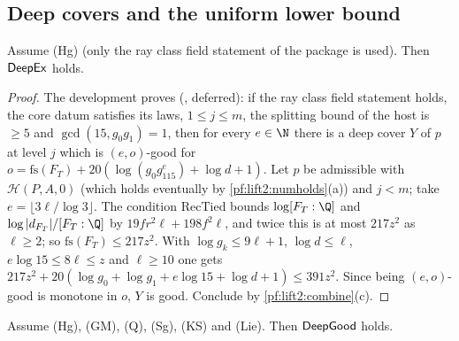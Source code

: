 \subsection{Deep covers and the uniform lower bound}\label{sec:pf:lift2:deep}

\begin{proposition}\label{pf:lift2:deepex}
Assume \textup{(Hg)} (only the ray class field statement of the package is used). Then $\mathsf{DeepEx}$ holds.
\end{proposition}

\begin{proof}
The development proves (, deferred): if the ray class
field statement holds, the core datum satisfies its laws, $1\le j\le m$, the splitting bound of the host is $\ge5$
and $\gcd(15,g_0g_1)=1$, then for every $e\in\N$ there is a deep cover $Y$ of $p$ at level $j$ which is
$(e,o)$-good for $o=\mathrm{fs}(F_T)+20(\log(g_0g_115^e)+\log d+1)$. Let $p$ be admissible with $\mathcal H(P,A,0)$
(which holds eventually by \cref{pf:lift2:numholds}(a)) and $j<m$; take $e=\lfloor3\ell/\log3\rfloor$. The condition
$\mathrm{RecTied}$ bounds $\log[F_T:\Q]$ and $\log|d_{F_T}|/[F_T:\Q]$ by $19fr^2\ell+198f^2\ell$, and twice this is
at most $217z^2$ as $\ell\ge2$; so $\mathrm{fs}(F_T)\le217z^2$. With $\log g_k\le9\ell+1$, $\log d\le\ell$,
$e\log15\le8\ell\le z$ and $\ell\ge10$ one gets $217z^2+20(\log g_0+\log g_1+e\log15+\log d+1)\le391z^2$. Since being
$(e,o)$-good is monotone in $o$, $Y$ is good. Conclude by \cref{pf:lift2:combine}(c).
\end{proof}

\begin{proposition}\label{pf:lift2:deepgood}
Assume \textup{(Hg)}, \textup{(GM)}, \textup{(Q)}, \textup{(Sg)}, \textup{(KS)} and \textup{(Lie)}. Then
$\mathsf{DeepGood}$ holds.
\end{proposition}

